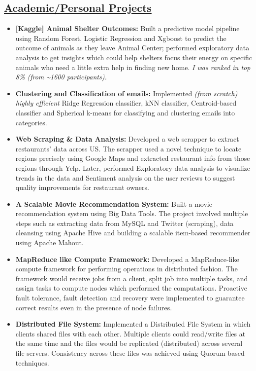\documentclass[10pt]{article}
\begin{document}
\subsection*{\underline{Academic/Personal Projects}}
\vspace{-0.1cm}
\begin{itemize}[leftmargin=0.15in]
\setlength{\itemsep}{0pt}%
\item {\bfseries [Kaggle] Animal Shelter Outcomes:} Built a predictive model pipeline using Random Forest, Logistic Regression and Xgboost to predict the outcome of animals as they leave Animal Center; performed exploratory data analysis to get insights which could help shelters focus their energy on specific animals who need a little extra help in finding new home. \textit{I was ranked in top 8\% (from \~{}1600 participants).}

\item {\bfseries Clustering and Classification of emails:} Implemented  \textit{(from scratch) highly efficient} Ridge Regression classifier, kNN classifier, Centroid-based classifier and Spherical k-means for classifying and clustering emails into categories.

\item {\bfseries Web Scraping \& Data Analysis:} Developed a web scrapper to extract restaurants' data across US. The scrapper used a novel technique to locate regions precisely using Google Maps and extracted restaurant info from those regions through Yelp. Later, performed Exploratory data analysis to visualize trends in the data and Sentiment analysis on the user reviews to suggest quality improvements for restaurant owners.

\item {\bfseries A Scalable Movie Recommendation System:} Built a movie recommendation system using Big Data Tools. The project involved multiple steps such as extracting data from MySQL and Twitter (scraping), data cleansing using Apache Hive and building a scalable item-based recommender using Apache Mahout.

\item {\bfseries MapReduce like Compute Framework:} Developed a MapReduce-like compute framework for performing operations in distributed fashion. The framework would receive jobs from a client, split job into multiple tasks, and assign tasks to compute nodes which performed the computations. Proactive fault tolerance, fault detection and recovery were implemented to guarantee correct results even in the presence of node failures.

\item {\bfseries Distributed File System:} Implemented a Distributed File System in which clients shared files with each other. Multiple clients could read/write files at the same time and the files would be replicated (distributed) across several file servers. Consistency across these files was achieved using Quorum based techniques.

\end{itemize}
\end{document}
